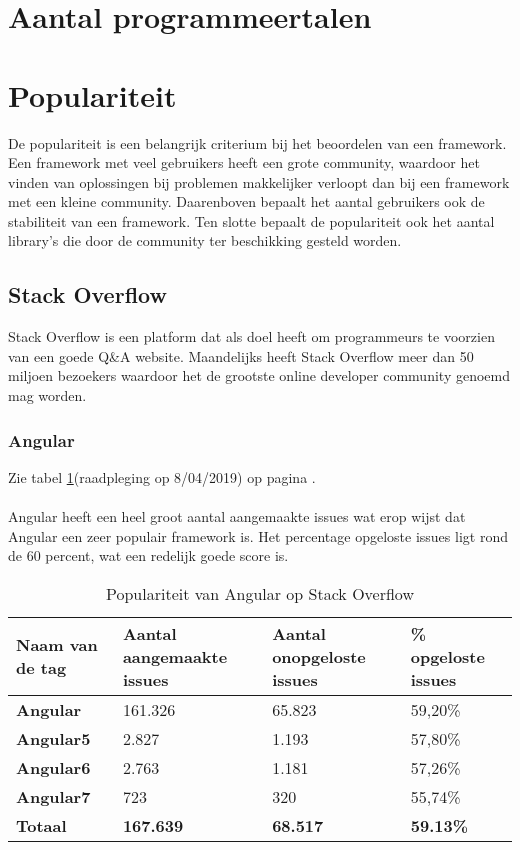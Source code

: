 \section{Aantal programmeertalen}



\section{Populariteit}
De populariteit is een belangrijk criterium bij het beoordelen van een framework. Een framework met veel gebruikers heeft een grote community, waardoor het vinden van oplossingen bij problemen makkelijker verloopt dan bij een framework met een kleine community. Daarenboven bepaalt het aantal gebruikers ook de stabiliteit van een framework. Ten slotte bepaalt de populariteit ook het aantal library's die door de community ter beschikking gesteld worden.
\subsection{Stack Overflow}
Stack Overflow is een platform dat als doel heeft om programmeurs te voorzien van een goede Q\&A website. Maandelijks heeft Stack Overflow meer dan 50 miljoen bezoekers waardoor het de grootste online developer community genoemd mag worden. 
\subsubsection{Angular}
Zie tabel \ref{table:angularstackoverflow}(raadpleging op 8/04/2019) op pagina \pageref{table:angularstackoverflow}. \\ \\
Angular heeft een heel groot aantal aangemaakte issues wat erop wijst dat Angular een zeer populair framework is. Het percentage opgeloste issues ligt rond de 60 percent, wat een redelijk goede score is.
\begin{table}[H]
	\begin{tabular}{|l|l|l|l|}
		\hline
		Naam van de tag   & \textbf{Aantal aangemaakte issues} & \textbf{Aantal onopgeloste issues} & \textbf{\% opgeloste issues} \\ \hline
		\textbf{Angular}  & 161.326                            & 65.823                             & 59,20\%                              \\ \hline
		\textbf{Angular5} & 2.827                              & 1.193                              & 57,80\%                              \\ \hline
		\textbf{Angular6} & 2.763                              & 1.181                              & 57,26\%                              \\ \hline
		\textbf{Angular7} & 723                                & 320                                & 55,74\%                              \\ \hline
		\textbf{Totaal}   & \textbf{167.639}                   & \textbf{68.517}                    & \textbf{59.13\%}                     \\ \hline
	\end{tabular}
\caption{Populariteit van Angular op Stack Overflow}
\label{table:angularstackoverflow}
\end{table}
